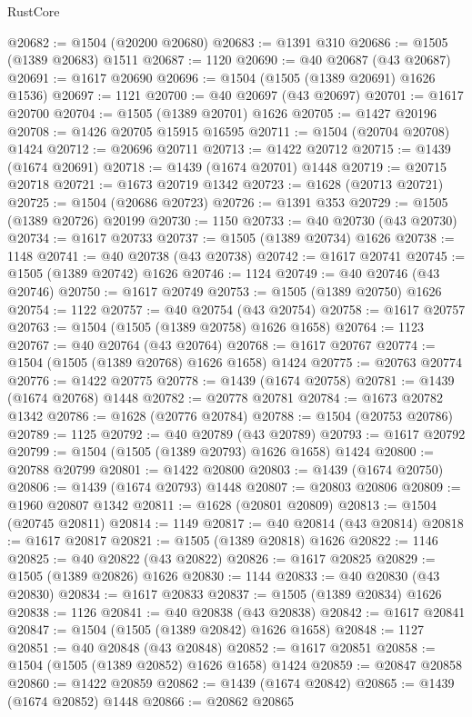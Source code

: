 \begin{lexlean}{RustCore}
\begin{coremodule}
@20682 := @1504 (@20200 @20680)
@20683 := @1391 @310
@20686 := @1505 (@1389 @20683) @1511
@20687 := 1120
@20690 := @40 @20687 (@43 @20687)
@20691 := @1617 @20690
@20696 := @1504 (@1505 (@1389 @20691) @1626 @1536)
@20697 := 1121
@20700 := @40 @20697 (@43 @20697)
@20701 := @1617 @20700
@20704 := @1505 (@1389 @20701) @1626
@20705 := @1427 @20196
@20708 := @1426 @20705 @15915 @16595
@20711 := @1504 (@20704 @20708) @1424
@20712 := @20696 @20711
@20713 := @1422 @20712
@20715 := @1439 (@1674 @20691)
@20718 := @1439 (@1674 @20701) @1448
@20719 := @20715 @20718
@20721 := @1673 @20719 @1342
@20723 := @1628 (@20713 @20721)
@20725 := @1504 (@20686 @20723)
@20726 := @1391 @353
@20729 := @1505 (@1389 @20726) @20199
@20730 := 1150
@20733 := @40 @20730 (@43 @20730)
@20734 := @1617 @20733
@20737 := @1505 (@1389 @20734) @1626
@20738 := 1148
@20741 := @40 @20738 (@43 @20738)
@20742 := @1617 @20741
@20745 := @1505 (@1389 @20742) @1626
@20746 := 1124
@20749 := @40 @20746 (@43 @20746)
@20750 := @1617 @20749
@20753 := @1505 (@1389 @20750) @1626
@20754 := 1122
@20757 := @40 @20754 (@43 @20754)
@20758 := @1617 @20757
@20763 := @1504 (@1505 (@1389 @20758) @1626 @1658)
@20764 := 1123
@20767 := @40 @20764 (@43 @20764)
@20768 := @1617 @20767
@20774 := @1504 (@1505 (@1389 @20768) @1626 @1658) @1424
@20775 := @20763 @20774
@20776 := @1422 @20775
@20778 := @1439 (@1674 @20758)
@20781 := @1439 (@1674 @20768) @1448
@20782 := @20778 @20781
@20784 := @1673 @20782 @1342
@20786 := @1628 (@20776 @20784)
@20788 := @1504 (@20753 @20786)
@20789 := 1125
@20792 := @40 @20789 (@43 @20789)
@20793 := @1617 @20792
@20799 := @1504 (@1505 (@1389 @20793) @1626 @1658) @1424
@20800 := @20788 @20799
@20801 := @1422 @20800
@20803 := @1439 (@1674 @20750)
@20806 := @1439 (@1674 @20793) @1448
@20807 := @20803 @20806
@20809 := @1960 @20807 @1342
@20811 := @1628 (@20801 @20809)
@20813 := @1504 (@20745 @20811)
@20814 := 1149
@20817 := @40 @20814 (@43 @20814)
@20818 := @1617 @20817
@20821 := @1505 (@1389 @20818) @1626
@20822 := 1146
@20825 := @40 @20822 (@43 @20822)
@20826 := @1617 @20825
@20829 := @1505 (@1389 @20826) @1626
@20830 := 1144
@20833 := @40 @20830 (@43 @20830)
@20834 := @1617 @20833
@20837 := @1505 (@1389 @20834) @1626
@20838 := 1126
@20841 := @40 @20838 (@43 @20838)
@20842 := @1617 @20841
@20847 := @1504 (@1505 (@1389 @20842) @1626 @1658)
@20848 := 1127
@20851 := @40 @20848 (@43 @20848)
@20852 := @1617 @20851
@20858 := @1504 (@1505 (@1389 @20852) @1626 @1658) @1424
@20859 := @20847 @20858
@20860 := @1422 @20859
@20862 := @1439 (@1674 @20842)
@20865 := @1439 (@1674 @20852) @1448
@20866 := @20862 @20865

\end{coremodule}
\end{lexlean}
